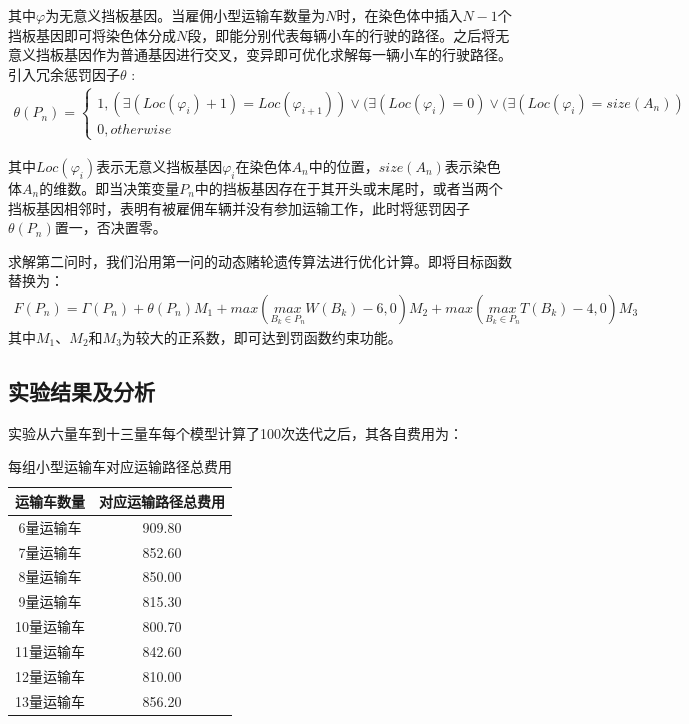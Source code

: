 \documentclass{whutmod}
\begin{document}
其中$\varphi$为无意义挡板基因。当雇佣小型运输车数量为$N$时，在染色体中插入$N-1$个挡板基因即可将染色体分成$N$段，即能分别代表每辆小车的行驶的路径。之后将无意义挡板基因作为普通基因进行交叉，变异即可优化求解每一辆小车的行驶路径。引入冗余惩罚因子$\theta$ :
\begin{gather}
\theta(P_n)=\left\{\begin{matrix}1,(\exists (Loc(\varphi_i )+1)=Loc(\varphi_{i+1} ))\vee  (\exists (Loc(\varphi_i )=0)\vee (\exists (Loc(\varphi_i )=size(A_n))
\\ 0,otherwise
\end{matrix}\right.
\end{gather}

其中$Loc(\varphi_i )$表示无意义挡板基因$\varphi_i$在染色体$A_n$中的位置，$size(A_n)$表示染色体$A_n$的维数。即当决策变量$P_n$中的挡板基因存在于其开头或末尾时，或者当两个挡板基因相邻时，表明有被雇佣车辆并没有参加运输工作，此时将惩罚因子$\theta(P_n)$置一，否决置零。

求解第二问时，我们沿用第一问的动态赌轮遗传算法进行优化计算。即将目标函数替换为：
\begin{gather}
F(P_n)= \Gamma (P_n)+\theta(P_n)M_1+max(\underset{B_k\in P_n}{max} W (B_k)-6 ,0) M_2+max(\underset{B_k\in P_n}{max}T (B_k)-4,0)M_3
\end{gather}
其中$M_1$、$M_2$和$M_3$为较大的正系数，即可达到罚函数约束功能。
 
  
        \subsection{实验结果及分析}
%  
实验从六量车到十三量车每个模型计算了100次迭代之后，其各自费用为：

  	\begin{table}[H]
	\centering		
	\caption{每组小型运输车对应运输路径总费用}\label{zhuanssssasgzai}
	\begin{tabular}{cc}
		\toprule[2pt]
		\multicolumn{1}{m{5cm}}{\centering 运输车数量}
		& \multicolumn{1}{m{5cm}}{\centering 对应运输路径总费用}
		\\
		\midrule[1pt]
		6量运输车 &   909.80\\ 
		7量运输车 & 	852.60\\ 
		8量运输车 &  	850.00 \\ 
		9量运输车 &  815.30 \\ 
		10量运输车 &   800.70\\ 
	11量运输车 & 	842.60 \\ 
		12量运输车 &810.00\\ 
		13量运输车 & 	856.20\\ 
		\bottomrule[2pt]	
	\end{tabular}
\end{table}
  
\end{document}
